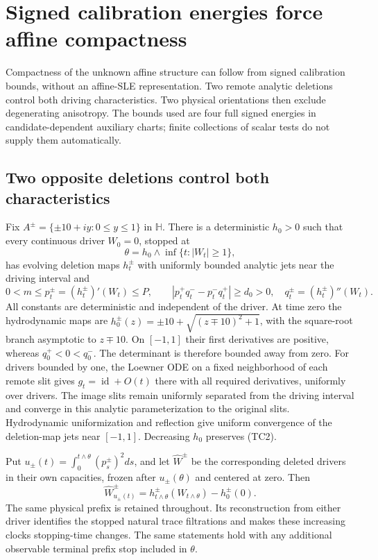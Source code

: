 \documentclass[11pt]{article}
\theoremstyle{definition}\newtheorem{definition}[theorem]{Definition}
\theoremstyle{remark}\newtheorem{remark}[theorem]{Remark}
\begin{document}
\section{Signed calibration energies force affine compactness}
\label{sec:affine-tensor-coercivity}

Compactness of the unknown affine structure can follow from signed
calibration bounds, without an affine-SLE representation. Two remote
analytic deletions control both driving characteristics. Two physical
orientations then exclude degenerating anisotropy. The bounds used are
four full signed energies in candidate-dependent auxiliary charts;
finite collections of scalar tests do not supply them automatically.

\subsection{Two opposite deletions control both characteristics}

Fix $A^\pm=\{\pm10+iy:0\le y\le1\}$ in $\mathbb H$. There is a
deterministic $h_0>0$ such that every continuous driver $W_0=0$,
stopped at
\[
 \theta=h_0\wedge\inf\{t:|W_t|\ge1\},
 \tag{TC1}
\]
has evolving deletion maps $h_t^\pm$ with uniformly bounded analytic
jets near the driving interval and
\[
 0<m\le p_t^\pm=(h_t^\pm)'(W_t)\le P,\qquad
 |p_t^+q_t^- -p_t^-q_t^+|\ge d_0>0,
 \quad q_t^\pm=(h_t^\pm)''(W_t).
 \tag{TC2}
\]
All constants are deterministic and independent of the driver. At
time zero the hydrodynamic maps are
$h_0^\pm(z)=\pm10+\sqrt{(z\mp10)^2+1}$, with the square-root branch
asymptotic to $z\mp10$. On $[-1,1]$ their first derivatives are
positive, whereas $q_0^+<0<q_0^-$. The determinant is therefore
bounded away from zero. For drivers bounded by one, the Loewner ODE
on a fixed neighborhood of each remote slit gives
$g_t=\operatorname{id}+O(t)$ there with all required derivatives,
uniformly over drivers. The image slits remain uniformly separated
from the driving interval and converge in this analytic
parameterization to the original slits. Hydrodynamic uniformization
and reflection give uniform convergence of the deletion-map jets
near $[-1,1]$. Decreasing $h_0$ preserves (TC2).

Put $u_\pm(t)=\int_0^{t\wedge\theta}(p_s^\pm)^2ds$, and let
$\widehat W^\pm$ be the corresponding deleted drivers in their own
capacities, frozen after $u_\pm(\theta)$ and centered at zero. Then
\[
 \widehat W^\pm_{u_\pm(t)}
       =h_{t\wedge\theta}^\pm(W_{t\wedge\theta})-h_0^\pm(0).
 \tag{TC3}
\]
The same physical prefix is retained throughout. Its reconstruction
from either driver identifies the stopped natural trace filtrations
and makes these increasing clocks stopping-time changes. The same
statements hold with any additional observable terminal prefix stop
included in $\theta$.
\end{document}
